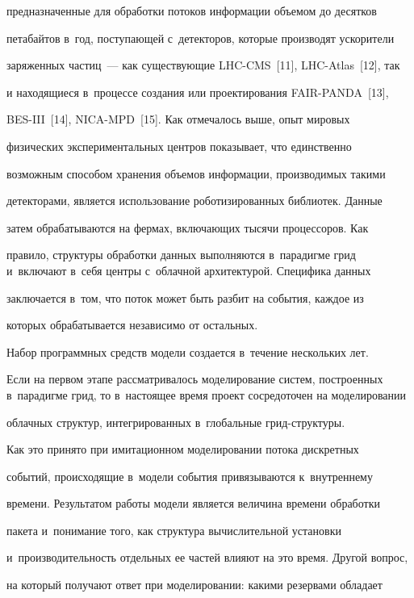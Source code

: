 предназначенные для обработки потоков информации объемом до десятков


петабайтов в~год, поступающей с~детекторов, которые производят ускорители


заряженных частиц~--- как существующие LHC-CMS~[11], LHC-Atlas~[12], так


и находящиеся в~процессе создания или проектирования FAIR-PANDA~[13],


BES-III~[14], NICA-MPD~[15]. Как отмечалось выше, опыт мировых


физических экспериментальных центров показывает, что единственно


возможным способом хранения объемов информации, производимых такими


детекторами, является использование роботизированных библиотек. Данные


затем обрабатываются на фермах, включающих тысячи процессоров. Как


правило, структуры обработки данных выполняются в~парадигме грид и~включают в~себя центры с~облачной архитектурой. Специфика данных


заключается в~том, что поток может быть разбит на события, каждое из


которых обрабатывается независимо от остальных.





  Набор программных средств модели создается в~течение нескольких лет.


Если на первом этапе рассматривалось моделирование систем, построенных в~парадигме грид, то в~настоящее время проект сосредоточен на моделировании


облачных структур, интегрированных в~глобальные грид-струк\-туры.





  Как это принято при имитационном моделировании потока дискретных


событий, происходящие в~модели события привязываются к~внутреннему


времени. Результатом работы модели является величина времени обработки


пакета и~понимание того, как структура вычислительной установки


и~производительность отдельных ее частей влияют на это время. Другой вопрос,


на который получают ответ при моделировании: какими резервами обладает


